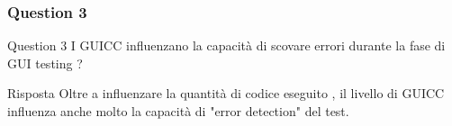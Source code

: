 \documentclass[12pt]{beamer}
\begin{document}
\begin{frame}
\frametitle{Question 3}

\begin{block}{Question 3}
I GUICC influenzano la capacit\`a di scovare errori durante la fase di GUI testing ?
\end{block}

\begin{block}{Risposta}
Oltre a influenzare la quantit\`a di codice eseguito ,  il livello di GUICC influenza anche molto la capacit\`a di "error detection" del test.
\end{block}

\end{frame}

\end{document}

